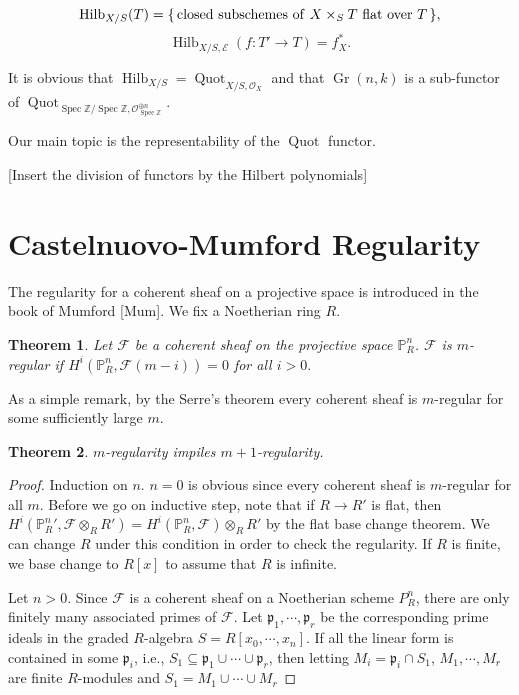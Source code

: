 \documentclass{article}
\theoremstyle{theorem}
\newtheorem{theorem}{Theorem}[section]
\begin{document}
    $$\operatorname{Hilb}_{X/S}(T) = \{\,{\rm closed\ subschemes\ of\ } X \times_S T {\rm \ flat \ over \ } T \, \},$$
    $$\operatorname{Hilb}_{X/S, \mathcal E}(f : T' \rightarrow T) = f_X^*.$$
        
    It is obvious that $\operatorname{Hilb}_{X/S} = \operatorname{Quot}_{X/S, \mathcal O_X}$ and that $\operatorname{Gr}(n, k)$ is a sub-functor of $\operatorname{Quot}_{\operatorname{Spec} \mathbb Z/\operatorname{Spec} \mathbb Z, \mathcal O_{\operatorname{Spec} \mathbb Z}^{\oplus n}}$.
    
    Our main topic is the representability of the $\operatorname{Quot}$ functor.
    \newline
    
    {[Insert the division of functors by the Hilbert polynomials]}
    
    \section{Castelnuovo-Mumford Regularity}
    The regularity for a coherent sheaf on a projective space is introduced in the book of Mumford {[Mum]}. We fix a Noetherian ring $R$.
    
    \begin{theorem}
        Let $\mathcal F$ be a coherent sheaf on the projective space $\mathbb P^n_R$. $\mathcal F$ is $m$-regular if $H^i(\mathbb P^n_R, \mathcal F(m-i)) = 0$ for all $i > 0.$
    \end{theorem}
    
    As a simple remark, by the Serre's theorem every coherent sheaf is $m$-regular for some sufficiently large $m$.
    
    \begin{theorem}
        $m$-regularity impiles $m+1$-regularity.
    \end{theorem}
    \begin{proof}
        Induction on $n$. $n = 0$ is obvious since every coherent sheaf is $m$-regular for all $m$. Before we go on inductive step, note that if $R \rightarrow R'$ is flat, then $H^i(\mathbb P^n_R', \mathcal F\otimes_R R') = H^i(\mathbb P^n_R, \mathcal F) \otimes_R R'$ by the flat base change theorem. We can change $R$ under this condition in order to check the regularity. If $R$ is finite, we base change to $R[x]$ to assume that $R$ is infinite.
        
        Let $n > 0$. Since $\mathcal F$ is a coherent sheaf on a Noetherian scheme $P^n_R$, there are only finitely many associated primes of $\mathcal F.$ Let $\mathfrak p_1, \cdots, \mathfrak p_r$ be the corresponding prime ideals in the graded $R$-algebra $S = R[x_0, \cdots, x_n]$. If all the linear form is contained in some $\mathfrak p_i$, i.e., $S_1 \subseteq \mathfrak p_1 \cup \cdots \cup \mathfrak p_r$, then letting $M_i = \mathfrak p_i \cap S_1$, $M_1, \cdots, M_r$ are finite $R$-modules and $S_1 = M_1 \cup \cdots \cup M_r$
    \end{proof}
    
\end{document}
